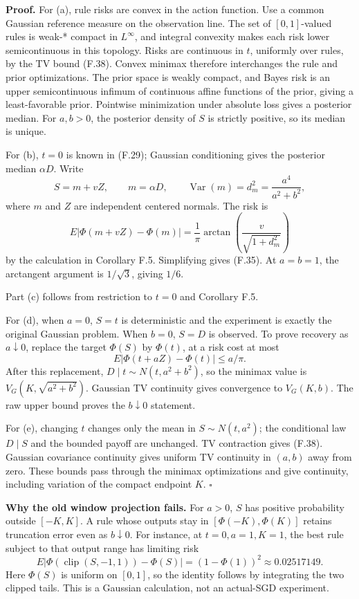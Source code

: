 \textbf{Proof.} For (a), rule risks are convex in the action function.
Use a common Gaussian reference measure on the observation line. The set
of \([0,1]\)-valued rules is weak-* compact in \(L^\infty\), and
integral convexity makes each risk lower semicontinuous in this
topology. Risks are continuous in \(t\), uniformly over rules, by the TV
bound (F.38). Convex minimax therefore interchanges the rule and prior
optimizations. The prior space is weakly compact, and Bayes risk is an
upper semicontinuous infimum of continuous affine functions of the
prior, giving a least-favorable prior. Pointwise minimization under
absolute loss gives a posterior median. For \(a,b>0\), the posterior
density of \(S\) is strictly positive, so its median is unique.

For (b), \(t=0\) is known in (F.29); Gaussian conditioning gives the
posterior median \(\alpha D\). Write \[
S=m+vZ,\qquad m=\alpha D,\qquad
\operatorname{Var}(m)=d_m^2=\frac{a^4}{a^2+b^2},
\] where \(m\) and \(Z\) are independent centered normals. The risk is
\[
E|\Phi(m+vZ)-\Phi(m)|
=\frac1\pi\arctan\!\left(\frac{v}{\sqrt{1+d_m^2}}\right)
\] by the calculation in Corollary F.5. Simplifying gives (F.35). At
\(a=b=1\), the arctangent argument is \(1/\sqrt3\), giving \(1/6\).

Part (c) follows from restriction to \(t=0\) and Corollary F.5.

For (d), when \(a=0\), \(S=t\) is deterministic and the experiment is
exactly the original Gaussian problem. When \(b=0\), \(S=D\) is
observed. To prove recovery as \(a\downarrow0\), replace the target
\(\Phi(S)\) by \(\Phi(t)\), at a risk cost at most \[
E|\Phi(t+aZ)-\Phi(t)|\le a/\pi.
\] After this replacement, \(D\mid t\sim N(t,a^2+b^2)\), so the minimax
value is \(V_G(K,\sqrt{a^2+b^2})\). Gaussian TV continuity gives
convergence to \(V_G(K,b)\). The raw upper bound proves the
\(b\downarrow0\) statement.

For (e), changing \(t\) changes only the mean in \(S\sim N(t,a^2)\); the
conditional law \(D\mid S\) and the bounded payoff are unchanged. TV
contraction gives (F.38). Gaussian covariance continuity gives uniform
TV continuity in \((a,b)\) away from zero. These bounds pass through the
minimax optimizations and give continuity, including variation of the
compact endpoint \(K\). \(\square\)

\textbf{Why the old window projection fails.} For \(a>0\), \(S\) has
positive probability outside \([-K,K]\). A rule whose outputs stay in
\([\Phi(-K),\Phi(K)]\) retains truncation error even as
\(b\downarrow0\). For instance, at \(t=0,a=1,K=1\), the best rule
subject to that output range has limiting risk \[
E|\Phi(\operatorname{clip}(S,-1,1))-\Phi(S)|
=(1-\Phi(1))^2\approx0.02517149.
\tag{F.40}
\] Here \(\Phi(S)\) is uniform on \([0,1]\), so the identity follows by
integrating the two clipped tails. This is a Gaussian calculation, not
an actual-SGD experiment.

